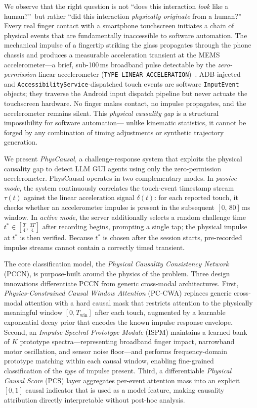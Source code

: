 We observe that the right question is not ``does this interaction \textit{look} like a
human?''\ but rather ``did this interaction \textit{physically originate} from a human?''%
Every real finger contact with a smartphone touchscreen initiates a chain of physical
events that are fundamentally inaccessible to software automation.%
The mechanical impulse of a fingertip striking the glass propagates through the phone chassis
and produces a measurable acceleration transient at the MEMS accelerometer---a brief,
sub-100\,ms broadband pulse detectable by the \textit{zero-permission} linear accelerometer
(\texttt{TYPE\_LINEAR\_ACCELERATION})~\cite{androidSensor}.%
ADB-injected and \texttt{AccessibilityService}-dispatched touch events are software
\texttt{InputEvent} objects; they traverse the Android input dispatch pipeline but never
actuate the touchscreen hardware.%
No finger makes contact, no impulse propagates, and the accelerometer remains silent.%
This \textit{physical causality gap} is a structural impossibility for software automation---
unlike kinematic statistics, it cannot be forged by any combination of timing adjustments
or synthetic trajectory generation.%

We present \textit{PhysCausal}, a challenge-response system that exploits the physical
causality gap to detect LLM GUI agents using only the zero-permission accelerometer.%
PhysCausal operates in two complementary modes.%
In \textit{passive mode}, the system continuously correlates the touch-event timestamp stream
$\tau(t)$ against the linear acceleration signal $\delta(t)$: for each reported touch, it
checks whether an accelerometer impulse is present in the subsequent $[0,\,80]$\,ms window.%
In \textit{active mode}, the server additionally selects a random challenge time
$t^* \in [\frac{T}{4},\frac{3T}{4}]$ after recording begins, prompting a single tap;
the physical impulse at $t^*$ is then verified.%
Because $t^*$ is chosen after the session starts, pre-recorded impulse streams cannot
contain a correctly timed transient.%

The core classification model, the \textit{Physical Causality Consistency Network} (PCCN),
is purpose-built around the physics of the problem.%
Three design innovations differentiate PCCN from generic cross-modal architectures.%
First, \textit{Physics-Constrained Causal Window Attention} (PC-CWA) replaces generic
cross-modal attention with a hard causal mask that restricts attention to the
physically meaningful window $[0, T_{\mathrm{win}}]$ after each touch, augmented by a
learnable exponential decay prior that encodes the known impulse response envelope.%
Second, an \textit{Impulse Spectral Prototype Module} (ISPM) maintains a learned bank
of $K$ prototype spectra---representing broadband finger impact, narrowband motor oscillation,
and sensor noise floor---and performs frequency-domain prototype matching within each
causal window, enabling fine-grained classification of the \textit{type} of impulse present.%
Third, a differentiable \textit{Physical Causal Score} (PCS) layer aggregates per-event
attention mass into an explicit $[0,1]$ causal indicator that is used as a model feature,
making causality attribution directly interpretable without post-hoc analysis.%

